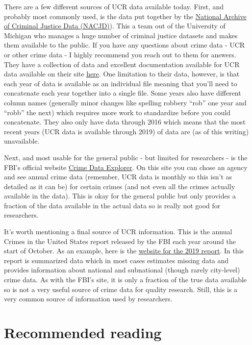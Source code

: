 \documentclass[
  12pt,
  openany]{book}
\begin{document}
There are a few different sources of UCR data available today. First, and probably most commonly used, is the data put together by the \href{https://www.icpsr.umich.edu/web/pages/NACJD/index.html}{National Archive of Criminal Justice Data (NACJD)}). This a team out of the University of Michigan who manages a huge number of criminal justice datasets and makes them available to the public. If you have any questions about crime data - UCR or other crime data - I highly recommend you reach out to them for answers. They have a collection of data and excellent documentation available for UCR data available on their site \href{https://www.icpsr.umich.edu/web/NACJD/series/57}{here}. One limitation to their data, however, is that each year of data is available as an individual file meaning that you'll need to concatenate each year together into a single file. Some years also have different column names (generally minor changes like spelling robbery ``rob'' one year and ``robb'' the next) which requires more work to standardize before you could concatenate. They also only have data through 2016 which means that the most recent years (UCR data is available through 2019) of data are (as of this writing) unavailable.

Next, and most usable for the general public - but limited for researchers - is the FBI's official website \href{https://crime-data-explorer.fr.cloud.gov/}{Crime Data Explorer}. On this site you can chose an agency and see annual crime data (remember, UCR data is monthly so this isn't as detailed as it can be) for certain crimes (and not even all the crimes actually available in the data). This is okay for the general public but only provides a fraction of the data available in the actual data so is really not good for researchers.

It's worth mentioning a final source of UCR information. This is the annual Crimes in the United States report released by the FBI each year around the start of October. As an example, here is the \href{https://ucr.fbi.gov/crime-in-the-u.s/2019/crime-in-the-u.s.-2019}{website for the 2019 report}. In this report is summarized data which in most cases estimates missing data and provides information about national and subnational (though rarely city-level) crime data. As with the FBI's site, it is only a fraction of the true data available so is not a very useful source of crime data for quality research. Still, this is a very common source of information used by researchers.

\section{Recommended reading}\label{recommended-reading}
\end{document}
